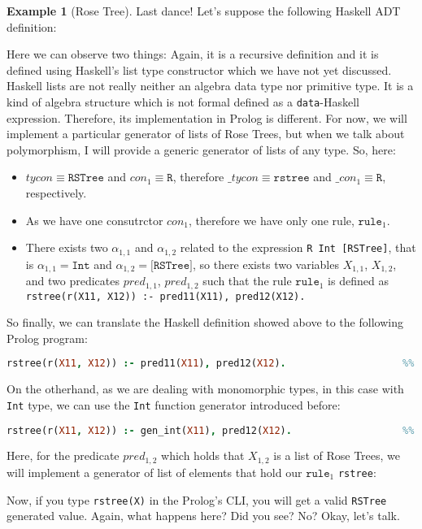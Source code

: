 \documentclass{report}
\theoremstyle{definition}
\newtheorem{example}{Example}[section]
\theoremstyle{definition}
\newcommand{\ttt}[1]{\texttt{#1}}
\begin{document}
\begin{example}[Rose Tree]
	Last dance! Let's suppose the following Haskell ADT definition:
	
	Here we can observe two things: Again, it is a recursive definition and it is defined using Haskell's list type constructor which we have not yet discussed. \\
	
	Haskell lists are not really neither an algebra data type nor primitive type. It is a kind of algebra structure which is not formal defined as a \ttt{data}-Haskell expression. Therefore, its implementation in Prolog is different. For now, we will implement a particular generator of lists of Rose Trees, but when we talk about polymorphism, I will provide a generic generator of lists of any type. So, here:
	\begin{itemize}
		\item $tycon \equiv \ttt{RSTree}$ and $con_1 \equiv \ttt{R}$, therefore $\_tycon \equiv \ttt{rstree}$ and $\_con_1 \equiv \ttt{R}$, respectively.
		\item As we have one consutrctor $con_1$, therefore we have only one rule, $\ttt{rule}_1$.
		\item There exists two $\alpha_{1,1}$ and $\alpha_{1,2}$ related to the expression \ttt{R Int [RSTree]}, that is $\alpha_{1,1} = \ttt{Int}$ and $\alpha_{1,2} = \ttt{[RSTree]}$, so there exists two variables $X_{1,1}$, $X_{1,2}$, and two predicates $pred_{1,1}$, $pred_{1,2}$ such that the rule $\ttt{rule}_1$ is defined as \\ \ttt{rstree(r(X11, X12)) :- pred11(X11), pred12(X12).}
	\end{itemize}
	So finally, we can translate the Haskell definition showed above to the following Prolog program:\\
\begin{lstlisting}[language=Prolog]
rstree(r(X11, X12)) :- pred11(X11), pred12(X12).					%% rule 1
\end{lstlisting}
On the otherhand, as we are dealing with monomorphic types, in this case with \ttt{Int} type, we can use the \ttt{Int} function generator introduced before:\\
\begin{lstlisting}[language=Prolog]
rstree(r(X11, X12)) :- gen_int(X11), pred12(X12).					%% rule 1
\end{lstlisting}
Here, for the predicate $pred_{1,2}$ which holds that $X_{1,2}$ is a list of Rose Trees, we will implement a generator of list of elements that hold our $\ttt{rule}_1$ \ttt{rstree}:

Now, if you type \ttt{rstree(X)} in the Prolog's CLI, you will get a valid \ttt{RSTree} generated value. Again, what happens here? Did you see? No? Okay, let's talk.\\
\end{example}
\end{document}
